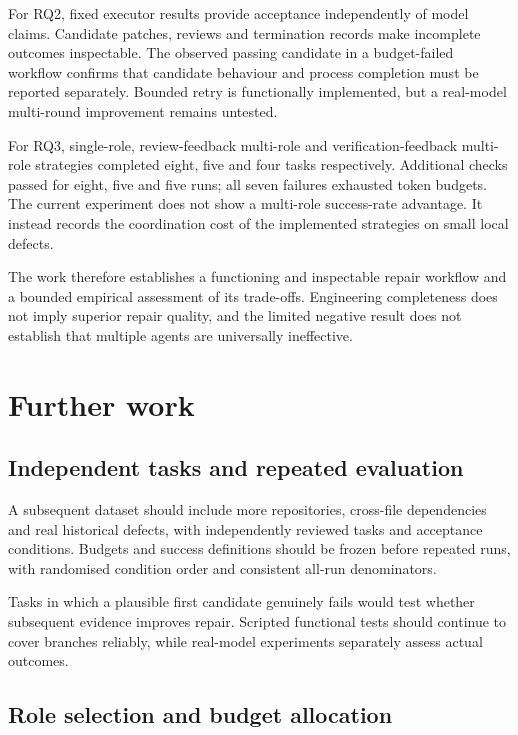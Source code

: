 For RQ2, fixed executor results provide acceptance independently of model claims. Candidate patches, reviews and termination records make incomplete outcomes inspectable. The observed passing candidate in a budget-failed workflow confirms that candidate behaviour and process completion must be reported separately. Bounded retry is functionally implemented, but a real-model multi-round improvement remains untested.

For RQ3, single-role, review-feedback multi-role and verification-feedback multi-role strategies completed eight, five and four tasks respectively. Additional checks passed for eight, five and five runs; all seven failures exhausted token budgets. The current experiment does not show a multi-role success-rate advantage. It instead records the coordination cost of the implemented strategies on small local defects.

The work therefore establishes a functioning and inspectable repair workflow and a bounded empirical assessment of its trade-offs. Engineering completeness does not imply superior repair quality, and the limited negative result does not establish that multiple agents are universally ineffective.

\section{Further work}\label{sec:8.3}

\subsection{Independent tasks and repeated evaluation}\label{sec:8.3.1}

A subsequent dataset should include more repositories, cross-file dependencies and real historical defects, with independently reviewed tasks and acceptance conditions. Budgets and success definitions should be frozen before repeated runs, with randomised condition order and consistent all-run denominators.

Tasks in which a plausible first candidate genuinely fails would test whether subsequent evidence improves repair. Scripted functional tests should continue to cover branches reliably, while real-model experiments separately assess actual outcomes.

\subsection{Role selection and budget allocation}\label{sec:8.3.2}

